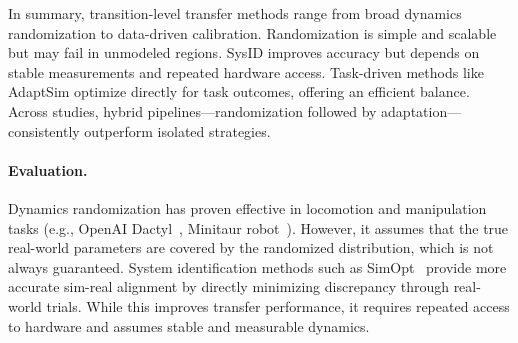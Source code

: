 In summary, transition-level transfer methods range from broad dynamics randomization to data-driven calibration. Randomization is simple and scalable but may fail in unmodeled regions. SysID improves accuracy but depends on stable measurements and repeated hardware access. Task-driven methods like AdaptSim optimize directly for task outcomes, offering an efficient balance. Across studies, hybrid pipelines—randomization followed by adaptation—consistently outperform isolated strategies\cite{Chebotar2019,Ren2023}.

\paragraph{Evaluation.} Dynamics randomization has proven effective in locomotion and manipulation tasks (e.g., OpenAI Dactyl~\cite{Akkaya2019}, Minitaur robot~\cite{Tan2018}). However, it assumes that the true real-world parameters are covered by the randomized distribution, which is not always guaranteed. System identification methods such as SimOpt~\cite{Chebotar2019} provide more accurate sim-real alignment by directly minimizing discrepancy through real-world trials. While this improves transfer performance, it requires repeated access to hardware and assumes stable and measurable dynamics.
